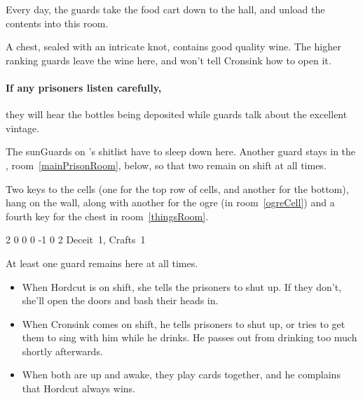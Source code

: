 
Every day, the guards take the food cart down to the hall, and unload the contents into this room.

A chest, sealed with an intricate knot, contains good quality wine.
The higher ranking guards leave the wine here, and won't tell Cronsink how to open it.

\paragraph{If any prisoners listen carefully,}
they will hear the bottles being deposited while guards talk about the excellent vintage.


The \glspl{sunGuard} on 's shitlist have to sleep down here.
Another guard stays in the , room~\ref{mainPrisonRoom}, below, so that two remain on shift at all times.

Two keys to the cells (one for the top row of cells, and another for the bottom), hang on the wall, along with another for the ogre (in room~\ref{ogreCell}) and a fourth key for the chest in room~\ref{thingsRoom}.

{2}%
{0}%
{{0}%
{0}%
{-1}}%
{0}%
{2}%
{
  Deceit~1, Crafts~1
  \knacks{\brawler, \berserker}
}%
{\shortsword}%
{}


At least one guard remains here at all times.
\begin{itemize}

  \item
  When Hordcut is on shift, she tells the prisoners to shut up.
  If they don't, she'll open the doors and bash their heads in.
  \item
  When Cronsink comes on shift, he tells prisoners to shut up, or tries to get them to sing with him while he drinks.
  He passes out from drinking too much shortly afterwards.
  \item
  When both are up and awake, they play cards together, and he complains that Hordcut always wins.

\end{itemize}


